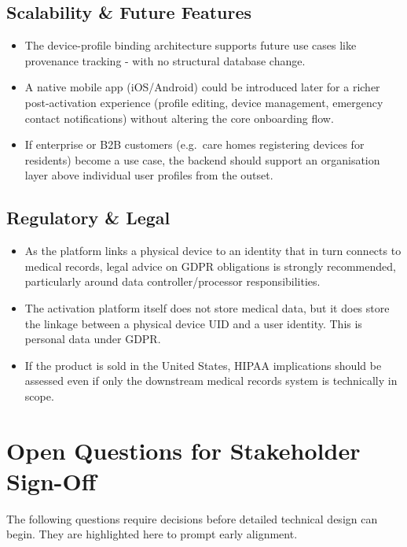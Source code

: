 \documentclass[
	a4paper, %
]{ChaosEngineReport}
\begin{document}
\subsection{Scalability \& Future Features}

\begin{itemize}
  \item The device-profile binding architecture supports future use cases like provenance tracking - with no structural database change.
  \item A native mobile app (iOS/Android) could be introduced later for a richer post-activation experience (profile editing, device management, emergency contact notifications) without altering the core onboarding flow.
  \item If enterprise or B2B customers (e.g.\ care homes registering devices for residents) become a use case, the backend should support an organisation layer above individual user profiles from the outset.
\end{itemize}

\subsection{Regulatory \& Legal}

\begin{itemize}
  \item As the platform links a physical device to an identity that in turn connects to medical records, legal advice on GDPR obligations is strongly recommended, particularly around data controller/processor responsibilities.
  \item The activation platform itself does not store medical data, but it does store the linkage between a physical device UID and a user identity. This is personal data under GDPR.
  \item If the product is sold in the United States, HIPAA implications should be assessed even if only the downstream medical records system is technically in scope.
\end{itemize}

\newpage

\section{Open Questions for Stakeholder Sign-Off}

\begin{callout_box}{}
The following questions require decisions before detailed technical design can begin. They are highlighted here to prompt early alignment.
\end{callout_box}
\end{document}
